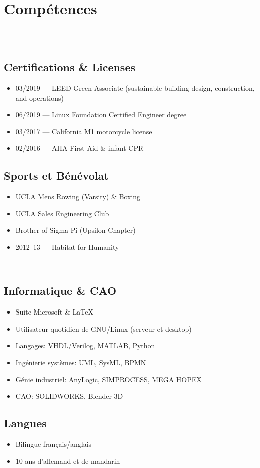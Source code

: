\documentclass[10pt]{article}
\begin{document}
\section*{Compétences}
\rule{\linewidth}{1pt}\\[0.2cm]
\begin{minipage}[t]{0.48\linewidth}
    \subsection*{Certifications \& Licenses}
    \begin{itemize}
        \item 03/2019 --- LEED Green Associate (sustainable building design, construction, and operations)
        \item 06/2019 --- Linux Foundation Certified Engineer degree
        \item 03/2017 --- California M1 motorcycle license
        \item 02/2016 --- AHA First Aid \& infant CPR
    \end{itemize}
    \subsection*{Sports et Bénévolat}
    \begin{itemize}
        \item UCLA Mens Rowing (Varsity) \& Boxing
        \item UCLA Sales Engineering Club
        \item Brother of Sigma Pi (Upsilon Chapter)
        \item 2012--13 --- Habitat for Humanity
    \end{itemize}
\end{minipage}
~
\begin{minipage}[t]{0.48\linewidth}
    \subsection*{Informatique \& CAO}
    \begin{itemize}
        \item Suite Microsoft \& \LaTeX
        \item Utilisateur quotidien de GNU/Linux (serveur et desktop)
        \item Langages: VHDL/Verilog, MATLAB, Python
        \item Ingénierie systèmes: UML, SysML, BPMN
        \item Génie industriel: AnyLogic, SIMPROCESS, MEGA HOPEX
        \item CAO: SOLIDWORKS, Blender 3D
    \end{itemize}
    \subsection*{Langues}
    \begin{itemize}
        \item Bilingue français/anglais
        \item 10 ans d'allemand et de mandarin
    \end{itemize}
\end{minipage}
\end{document}
